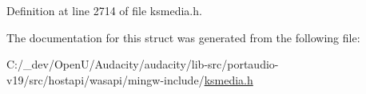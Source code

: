 Definition at line 2714 of file ksmedia.\+h.



The documentation for this struct was generated from the following file\+:\begin{DoxyCompactItemize}
\item 
C\+:/\+\_\+dev/\+Open\+U/\+Audacity/audacity/lib-\/src/portaudio-\/v19/src/hostapi/wasapi/mingw-\/include/\hyperlink{ksmedia_8h}{ksmedia.\+h}\end{DoxyCompactItemize}
